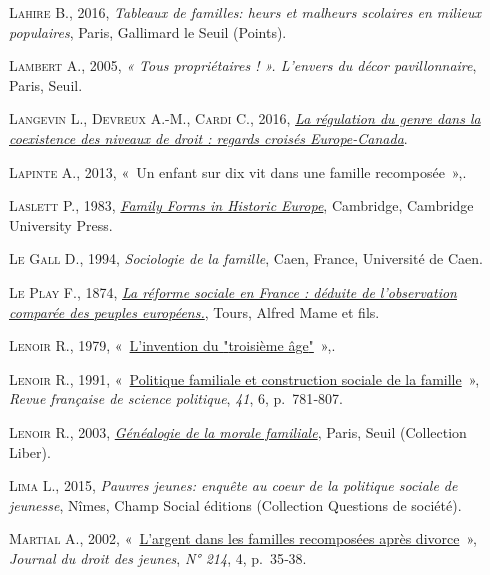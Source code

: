 \documentclass[
  12pt,
]{book}
\newlength{\cslhangindent}
\newenvironment{CSLReferences}[2] %
 {\begin{list}{}{%
  \setlength{\itemindent}{0pt}
  \setlength{\leftmargin}{0pt}
  \setlength{\parsep}{0pt}
  \ifodd #1
   \setlength{\leftmargin}{\cslhangindent}
   \setlength{\itemindent}{-1\cslhangindent}
  \fi
  \setlength{\itemsep}{#2\baselineskip}}}
 {\end{list}}
\begin{document}
\begin{CSLReferences}{0}{1}
\textsc{Lahire B.}, 2016, \emph{Tableaux de familles: heurs et malheurs
scolaires en milieux populaires}, Paris, Gallimard le Seuil (Points).

\textsc{Lambert A.}, 2005, \emph{« Tous propriétaires ! ». L{'}envers du
décor pavillonnaire}, Paris, Seuil.

\textsc{Langevin L.}, \textsc{Devreux A.-M.}, \textsc{Cardi C.}, 2016,
\emph{\href{https://utpjournals.press/doi/10.3138/cjwl.28.3.ix}{La
régulation du genre dans la coexistence des niveaux de droit : regards
croisés Europe-Canada}}.

\textsc{Lapinte A.}, 2013, {«~Un enfant sur dix vit dans une famille
recomposée~»},.

\textsc{Laslett P.}, 1983,
\emph{\href{https://doi.org/10.1017/CBO9780511897535}{Family Forms in
Historic Europe}}, Cambridge, Cambridge University Press.

\textsc{Le Gall D.}, 1994, \emph{Sociologie de la famille}, Caen,
France, Université de Caen.

\textsc{Le Play F.}, 1874,
\emph{\href{https://gallica.bnf.fr/ark:/12148/bpt6k209942s}{La réforme
sociale en France : déduite de l'observation comparée des peuples
européens.}}, Tours, Alfred Mame et fils.

\textsc{Lenoir R.}, 1979,
{«~\href{https://doi.org/10.3406/arss.1979.2630}{L'invention du
{"}troisième âge{"}}~»},.

\textsc{Lenoir R.}, 1991,
{«~\href{https://doi.org/10.3406/rfsp.1991.394601}{Politique familiale
et construction sociale de la famille}~»}, \emph{Revue française de
science politique}, \emph{41}, 6, p.~781‑807.

\textsc{Lenoir R.}, 2003,
\emph{\href{http://banq.pretnumerique.ca/accueil/isbn/9782021009064}{Généalogie
de la morale familiale}}, Paris, Seuil (Collection Liber).

\textsc{Lima L.}, 2015, \emph{Pauvres jeunes: enquête au coeur de la
politique sociale de jeunesse}, Nîmes, Champ Social éditions (Collection
Questions de société).

\textsc{Martial A.}, 2002,
{«~\href{http://www.cairn.info/revue-journal-du-droit-des-jeunes-2002-4-page-35.htm}{L'argent
dans les familles recomposées après divorce}~»}, \emph{Journal du droit
des jeunes}, \emph{N° 214}, 4, p.~35‑38.


\end{CSLReferences}
\end{document}

